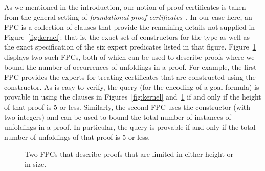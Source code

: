{\color{red}
As we mentioned in the introduction, our notion of proof certificates
 is taken from the general setting of \emph{foundational
  proof certificates}~\cite{chihani17jar}.
%
In our case here, an FPC is a collection of \lP clauses that
provide the remaining details not supplied in Figure~\ref{fig:kernel}:
that is, the exact set of constructors for the  type as
well as the exact specification of the six expert predicates listed in
that figure.
%
Figure~\ref{fig:resources} displays two such FPCs,
both of which can be used to describe proofs where we bound
the number of occurrences of unfoldings in a proof.
%
For example, the first FPC
provides the experts for treating certificates that are constructed
using the  constructor.
%
As is easy to verify, the query \mbox{} (for the
encoding  of a goal formula) is provable in \lP using the
clauses in Figures~\ref{fig:kernel} and~\ref{fig:resources} if and
only if the height of that proof is 5 or less.
%
Similarly, the second FPC uses the constructor  (with two
integers) and can be used to bound the total number of instances of
unfoldings in a proof.
%
In particular, the query \mbox{}
is provable if and only if the total number of unfoldings of that
proof is 5 or less.

\begin{figure}


\caption{Two FPCs that describe proofs that are limited in either
  height or in size.}
\label{fig:resources}
\end{figure}

%

}
